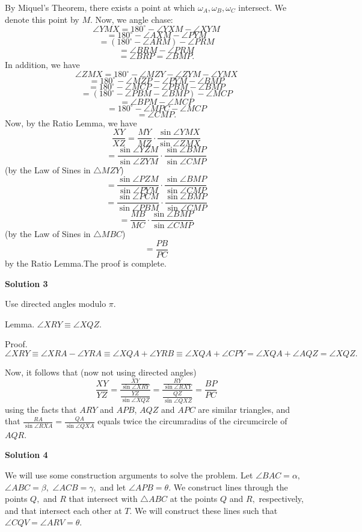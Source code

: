 \begin{enumerate}
 By Miquel's Theorem, there exists a point at which $\omega_A, \omega_B, \omega_C$ intersect. We denote this point by $M.$ Now, we angle chase:
 \[\angle YMX = 180^{\circ} - \angle YXM - \angle XYM\]
 \[= 180^{\circ} - \angle AXM - \angle PYM\]
 \[= \left(180^{\circ} - \angle ARM\right) - \angle PRM\]
 \[= \angle BRM - \angle PRM\]
 \[= \angle BRP = \angle BMP.\]In addition, we have
 \[\angle ZMX = 180^{\circ} - \angle MZY - \angle ZYM - \angle YMX\]
 \[= 180^{\circ} - \angle MZP - \angle PYM - \angle BMP\]
 \[= 180^{\circ} - \angle MCP - \angle PBM - \angle BMP\]
 \[= \left(180^{\circ} - \angle PBM - \angle BMP\right) - \angle MCP\]
 \[= \angle BPM - \angle MCP\]
 \[= 180^{\circ} - \angle MPC - \angle MCP\]
 \[= \angle CMP.\]Now, by the Ratio Lemma, we have
 \[\frac{XY}{XZ} = \frac{MY}{MZ} \cdot \frac{\sin \angle YMX}{\sin \angle ZMX}\]
 \[= \frac{\sin \angle YZM}{\sin \angle ZYM} \cdot \frac{\sin \angle BMP}{\sin \angle CMP}\] (by the Law of Sines in $\triangle MZY$)
 \[= \frac{\sin \angle PZM}{\sin \angle PYM} \cdot \frac{\sin \angle BMP}{\sin \angle CMP}\]
 \[= \frac{\sin \angle PCM}{\sin \angle PBM} \cdot \frac{\sin \angle BMP}{\sin \angle CMP}\]
 \[= \frac{MB}{MC} \cdot \frac{\sin \angle BMP}{\sin \angle CMP}\] (by the Law of Sines in $\triangle MBC$)
 \[= \frac{PB}{PC}\] by the Ratio Lemma.The proof is complete.

 



\textbf{Solution 3}

Use directed angles modulo $\pi$.

 Lemma. $\angle{XRY} \equiv \angle{XQZ}.$

 Proof. 
 \[\angle{XRY} \equiv \angle{XRA} - \angle{YRA} \equiv \angle{XQA} + \angle{YRB} \equiv \angle{XQA} + \angle{CPY} = \angle{XQA} + \angle{AQZ} = \angle{XQZ}.\]

 Now, it follows that (now not using directed angles)
 \[\frac{XY}{YZ} = \frac{\frac{XY}{\sin \angle{XRY}}}{\frac{YZ}{\sin \angle{XQZ}}} = \frac{\frac{RY}{\sin \angle{RXY}}}{\frac{QZ}{\sin \angle{QXZ}}} = \frac{BP}{PC}\]using the facts that $ARY$ and $APB$, $AQZ$ and $APC$ are similar triangles, and that $\frac{RA}{\sin \angle{RXA}} = \frac{QA}{\sin \angle{QXA}}$ equals twice the circumradius of the circumcircle of $AQR$.

 



\textbf{Solution 4}

We will use some construction arguments to solve the problem. Let $\angle BAC=\alpha,$ $\angle ABC=\beta,$ $\angle ACB=\gamma,$ and let $\angle APB=\theta.$ We construct lines through the points $Q,$ and $R$ that intersect with $\triangle ABC$ at the points $Q$ and $R,$ respectively, and that intersect each other at $T.$ We will construct these lines such that $\angle CQV=\angle ARV=\theta.$


\end{enumerate}
